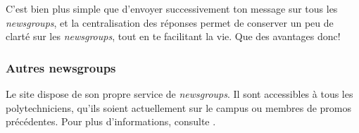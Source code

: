 C'est bien plus simple que d'envoyer successivement ton message sur tous les \emph{newsgroups}, et la centralisation des réponses permet de conserver
un peu de clarté sur les \emph{newsgroups}, tout en te facilitant la vie. Que des avantages donc!


\subsubsection{Autres newsgroups}
Le site  dispose de son propre service de \emph{newsgroups}. Il sont
accessibles à tous les polytechniciens, qu'ils soient actuellement sur le campus ou membres de
promos précédentes. Pour plus d'informations, consulte .
